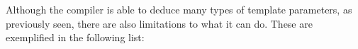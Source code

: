 Although the compiler is able to deduce many types of template parameters, as previously seen, there are also limitations to what it can do. These are exemplified in the following list:

















































